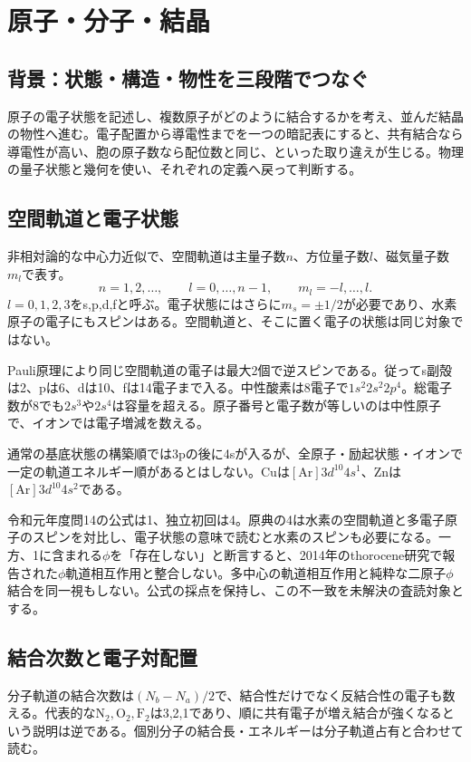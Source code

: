 \chapter{原子・分子・結晶}
\section{背景：状態・構造・物性を三段階でつなぐ}
原子の電子状態を記述し、複数原子がどのように結合するかを考え、並んだ結晶の物性へ進む。電子配置から導電性までを一つの暗記表にすると、共有結合なら導電性が高い、胞の原子数なら配位数と同じ、といった取り違えが生じる。物理の量子状態と幾何を使い、それぞれの定義へ戻って判断する。

\section{空間軌道と電子状態}\label{theory:atomic:orbital}
非相対論的な中心力近似で、空間軌道は主量子数\(n\)、方位量子数\(l\)、磁気量子数\(m_l\)で表す。
\[
 n=1,2,\ldots,\qquad l=0,\ldots,n-1,\qquad m_l=-l,\ldots,l.
\]
\(l=0,1,2,3\)をs,p,d,fと呼ぶ。電子状態にはさらに\(m_s=\pm1/2\)が必要であり、水素原子の電子にもスピンはある。空間軌道と、そこに置く電子の状態は同じ対象ではない\cite{atomic_quantum}。

Pauli原理により同じ空間軌道の電子は最大2個で逆スピンである。従ってs副殻は2、pは6、dは10、fは14電子まで入る。中性酸素は8電子で\(1s^2 2s^2 2p^4\)。総電子数が8でも\(2s^3\)や\(2s^4\)は容量を超える。原子番号と電子数が等しいのは中性原子で、イオンでは電子増減を数える。

通常の基底状態の構築順では3pの後に4sが入るが、全原子・励起状態・イオンで一定の軌道エネルギー順があるとはしない。Cuは\([\mathrm{Ar}]3d^{10}4s^1\)、Znは\([\mathrm{Ar}]3d^{10}4s^2\)である\cite{atomic_nist2019}。

\begin{tcolorbox}[title=公式正答と独立判断の相違を残す]
令和元年度問14の公式は1、独立初回は4。原典の4は水素の空間軌道と多電子原子のスピンを対比し、電子状態の意味で読むと水素のスピンも必要になる。一方、1に含まれる\(\phi\)を「存在しない」と断言すると、2014年のthorocene研究で報告された\(\phi\)軌道相互作用と整合しない\cite{atomic_phi2014}。多中心の軌道相互作用と純粋な二原子\(\phi\)結合を同一視もしない。公式の採点を保持し、この不一致を未解決の査読対象とする。
\end{tcolorbox}

\section{結合次数と電子対配置}\label{theory:atomic:bonding}
分子軌道の結合次数は\((N_b-N_a)/2\)で、結合性だけでなく反結合性の電子も数える。代表的な\(\mathrm{N_2,O_2,F_2}\)は3,2,1であり、順に共有電子が増え結合が強くなるという説明は逆である。個別分子の結合長・エネルギーは分子軌道占有と合わせて読む。

